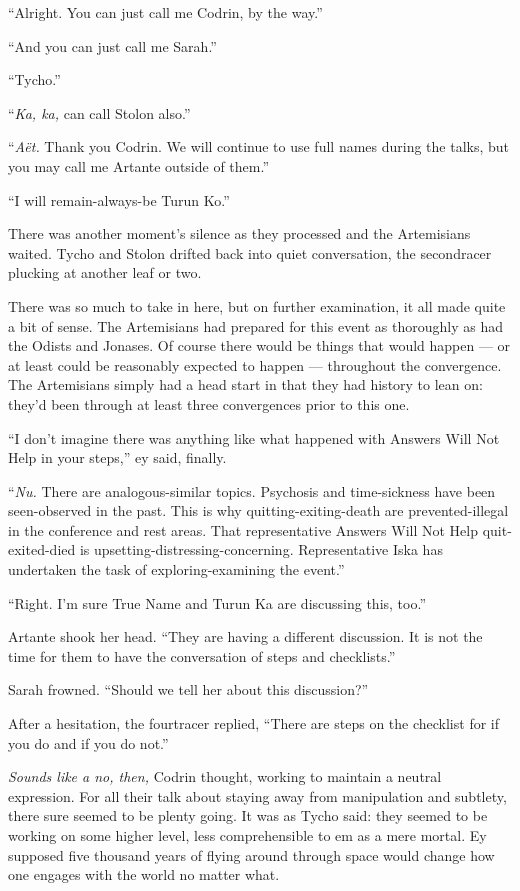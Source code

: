 ``Alright. You can just call me Codrin, by the way.''

``And you can just call me Sarah.''

``Tycho.''

``\emph{Ka, ka,} can call Stolon also.''

``\emph{Aët.} Thank you Codrin. We will continue to use full names during the talks, but you may call me Artante outside of them.''

``I will remain-always-be Turun Ko.''

There was another moment's silence as they processed and the Artemisians waited. Tycho and Stolon drifted back into quiet conversation, the secondracer plucking at another leaf or two.

There was so much to take in here, but on further examination, it all made quite a bit of sense. The Artemisians had prepared for this event as thoroughly as had the Odists and Jonases. Of course there would be things that would happen — or at least could be reasonably expected to happen — throughout the convergence. The Artemisians simply had a head start in that they had history to lean on: they'd been through at least three convergences prior to this one.

``I don't imagine there was anything like what happened with Answers Will Not Help in your steps,'' ey said, finally.

``\emph{Nu.} There are analogous-similar topics. Psychosis and time-sickness have been seen-observed in the past. This is why quitting-exiting-death are prevented-illegal in the conference and rest areas. That representative Answers Will Not Help quit-exited-died is upsetting-distressing-concerning. Representative Iska has undertaken the task of exploring-examining the event.''

``Right. I'm sure True Name and Turun Ka are discussing this, too.''

Artante shook her head. ``They are having a different discussion. It is not the time for them to have the conversation of steps and checklists.''

Sarah frowned. ``Should we tell her about this discussion?''

After a hesitation, the fourtracer replied, ``There are steps on the checklist for if you do and if you do not.''

\emph{Sounds like a no, then,} Codrin thought, working to maintain a neutral expression. For all their talk about staying away from manipulation and subtlety, there sure seemed to be plenty going. It was as Tycho said: they seemed to be working on some higher level, less comprehensible to em as a mere mortal. Ey supposed five thousand years of flying around through space would change how one engages with the world no matter what.

